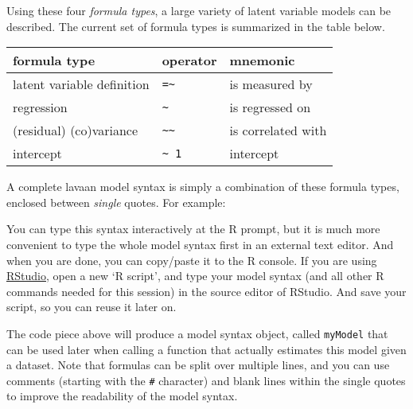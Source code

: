 Using these four \emph{formula types}, a large variety of latent
variable models can be described. The current set of formula types is
summarized in the table below.

\begin{longtable}[]{@{}lll@{}}
\toprule
formula type & operator & mnemonic\tabularnewline
\midrule
\endhead
latent variable definition & \texttt{=\textasciitilde{}} & is measured
by\tabularnewline
regression & \texttt{\textasciitilde{}} & is regressed on\tabularnewline
(residual) (co)variance & \texttt{\textasciitilde{}\textasciitilde{}} &
is correlated with\tabularnewline
intercept & \texttt{\textasciitilde{}\ 1} & intercept\tabularnewline
\bottomrule
\end{longtable}

A complete lavaan model syntax is simply a combination of these formula
types, enclosed between \emph{single} quotes. For example:

\begin{Shaded}
\begin{Highlighting}[]



\end{Highlighting}
\end{Shaded}

You can type this syntax interactively at the R prompt, but it is much
more convenient to type the whole model syntax first in an external text
editor. And when you are done, you can copy/paste it to the R console.
If you are using \href{http://www.rstudio.com/}{RStudio}, open a new `R
script', and type your model syntax (and all other R commands needed for
this session) in the source editor of RStudio. And save your script, so
you can reuse it later on.

The code piece above will produce a model syntax object, called
\texttt{myModel} that can be used later when calling a function that
actually estimates this model given a dataset. Note that formulas can be
split over multiple lines, and you can use comments (starting with the
\texttt{\#} character) and blank lines within the single quotes to
improve the readability of the model syntax.

